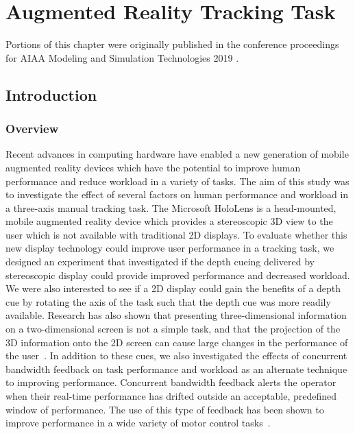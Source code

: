 \chapter{Augmented Reality Tracking Task}
\label{chap:3dtracking}

Portions of this chapter were originally published in the conference proceedings for AIAA Modeling and Simulation Technologies 2019 \citep{karasinski_evaluating_2019}.

\section{Introduction}
\subsection{Overview}
Recent advances in computing hardware have enabled a new generation of mobile augmented reality devices which have the potential to improve human performance and reduce workload in a variety of tasks.
The aim of this study was to investigate the effect of several factors on human performance and workload in a three-axis manual tracking task.
The Microsoft HoloLens is a head-mounted, mobile augmented reality device which provides a stereoscopic 3D view to the user which is not available with traditional 2D displays.
To evaluate whether this new display technology could improve user performance in a tracking task, we designed an experiment that investigated if the depth cueing delivered by stereoscopic display could provide improved performance and decreased workload.
We were also interested to see if a 2D display could gain the benefits of a depth cue by rotating the axis of the task such that the depth cue was more readily available.
Research has also shown that presenting three-dimensional information on a two-dimensional screen is not a simple task, and that the projection of the 3D information onto the 2D screen can cause large changes in the performance of the user~\citep{kim_quantitative_1987}.
In addition to these cues, we also investigated the effects of concurrent bandwidth feedback on task performance and workload as an alternate technique to improving performance.
Concurrent bandwidth feedback alerts the operator when their real-time performance has drifted outside an acceptable, predefined window of performance.
The use of this type of feedback has been shown to improve performance in a wide variety of motor control tasks~\citep{salmoni_knowledge_1984,sigrist_augmented_2013,karasinski_real-time_2017}.

